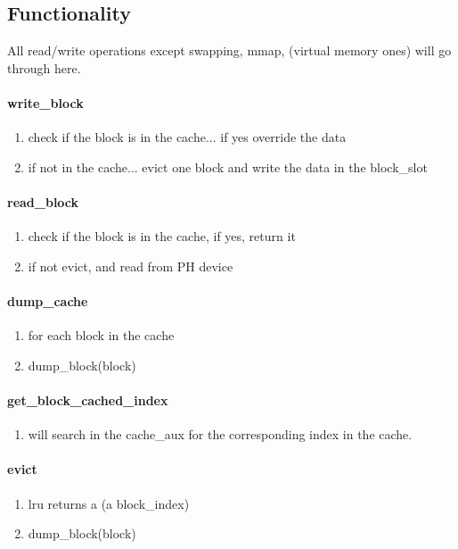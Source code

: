 \subsection{Functionality}
All read/write operations except swapping, mmap, (virtual memory ones) will go through here.  


\paragraph {write\_block}
\begin{enumerate}
	\item check if the block is in the cache... if yes override the data
	\item if not in the cache... evict one block and write the data in the block\_slot
\end{enumerate}

\paragraph {read\_block}
\begin{enumerate}
	\item check if the block is in the cache, if yes, return it
	\item if not evict, and read from PH device
\end{enumerate}

\paragraph {dump\_cache}
\begin{enumerate}
	\item for each block in the cache
	\item dump\_block(block)
\end{enumerate}


\paragraph {get\_block\_cached\_index}
\begin{enumerate}
	\item will search in the cache\_aux for the corresponding index in the cache.
\end{enumerate}

\paragraph {evict}
\begin{enumerate}
	\item lru returns a (a block\_index)
	\item dump\_block(block)
\end{enumerate}

